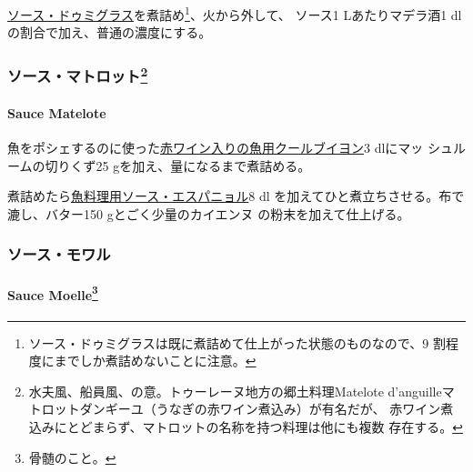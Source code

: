 \begin{recette}
  

\protect\hyperlink{sauce-demi-glace}{ソース・ドゥミグラス}を煮詰め\footnote{ソース・ドゥミグラスは既に煮詰めて仕上がった状態のものなので、9
  割程度にまでしか煮詰めないことに注意。}、火から外して、 ソース1
Lあたりマデラ酒1 dlの割合で加え、普通の濃度にする。

\maeaki

\hypertarget{ux30bdux30fcux30b9ux30deux30c8ux30edux30c3ux30c854}{%
\subsubsection[ソース・マトロット]{\texorpdfstring{ソース・マトロット\footnote{水夫風、船員風、の意。トゥーレーヌ地方の郷土料理Matelote
  d'anguilleマトロットダンギーユ（うなぎの赤ワイン煮込み）が有名だが、
  赤ワイン煮込みにとどまらず、マトロットの名称を持つ料理は他にも複数
  存在する。}}{ソース・マトロット}}\label{ux30bdux30fcux30b9ux30deux30c8ux30edux30c3ux30c854}}

\hypertarget{sauce-matelote}{%
\paragraph{Sauce Matelote}\label{sauce-matelote}}

   

魚をポシェするのに使った\protect\hyperlink{}{赤ワイン入りの魚用クールブイヨン}3
dlにマッ シュルームの切りくず25
gを加え、\untiers{}量になるまで煮詰める。

煮詰めたら\protect\hyperlink{sauce-espagnole-maigre}{魚料理用ソース・エスパニョル}8
dl を加えてひと煮立ちさせる。布で漉し、バター150 gとごく少量のカイエンヌ
の粉末を加えて仕上げる。

\maeaki

\hypertarget{ux30bdux30fcux30b9ux30e2ux30efux30eb}{%
\subsubsection{ソース・モワル}\label{ux30bdux30fcux30b9ux30e2ux30efux30eb}}

\hypertarget{sauce-moelle}{%
\paragraph[Sauce Moelle]{\texorpdfstring{Sauce Moelle\footnote{骨髄のこと。}}{Sauce Moelle}}\label{sauce-moelle}}


\end{recette}
